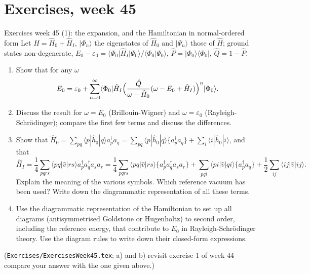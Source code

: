\documentclass[aspectratio=169,10pt]{beamer}
\newcommand{\ket}[1]{\vert #1\rangle}
\newcommand{\bra}[1]{\langle #1\vert}
\newcommand{\braket}[2]{\langle #1\vert #2\rangle}
\begin{document}
\section{Exercises, week 45}

\begin{frame}[shrink=8]{Exercises week 45 (1): the expansion, and the Hamiltonian in normal-ordered form}
Let \(\hat H=\hat H_0+\hat H_I\), \(\ket{\Phi_n}\) the eigenstates of \(\hat H_0\) and \(\ket{\Psi_n}\) those of \(\hat H\); ground states non-degenerate, \(E_0-\varepsilon_0=\bra{\Phi_0}\hat H_I\ket{\Psi_0}/\braket{\Phi_0}{\Psi_0}\), \(\hat P=\ket{\Phi_0}\bra{\Phi_0}\), \(\hat Q=1-\hat P\).
\begin{enumerate}
\item[a)] Show that for any \(\omega\)
\[
E_0=\varepsilon_0+\sum_{n=0}^{\infty}\bra{\Phi_0}\hat H_I\Bigl(\frac{\hat Q}{\omega-\hat H_0}(\omega-E_0+\hat H_I)\Bigr)^n\ket{\Phi_0}.
\]
\item[b)] Discuss the result for \(\omega=E_0\) (Brillouin-Wigner) and \(\omega=\varepsilon_0\) (Rayleigh-Schr\"odinger); compare the first few terms and discuss the differences.
\item[c)] Show that \(\hat H_0=\sum_{pq}\langle p|\hat h_0|q\rangle a^\dagger_pa_q=\sum_{pq}\langle p|\hat h_0|q\rangle\{a^\dagger_pa_q\}+\sum_i\langle i|\hat h_0|i\rangle\), and that
\[
\hat H_I=\frac14\sum_{pqrs}\langle pq|\hat v|rs\rangle a^\dagger_pa^\dagger_qa_sa_r
=\frac14\sum_{pqrs}\langle pq|\hat v|rs\rangle\{a^\dagger_pa^\dagger_qa_sa_r\}+\sum_{pqi}\langle pi|\hat v|qi\rangle\{a^\dagger_pa_q\}+\frac12\sum_{ij}\langle ij|\hat v|ij\rangle .
\]
Explain the meaning of the various symbols. Which reference vacuum has been used? Write down the diagrammatic representation of all these terms.
\item[d)] Use the diagrammatic representation of the Hamiltonian to set up all diagrams (antisymmetrised Goldstone or Hugenholtz) to second order, including the reference energy, that contribute to \(E_0\) in Rayleigh-Schr\"odinger theory. Use the diagram rules to write down their closed-form expressions.
\end{enumerate}
\small (\texttt{Exercises/ExercisesWeek45.tex}; a) and b) revisit exercise 1 of week 44 -- compare your answer with the one given above.)
\end{frame}
\end{document}
